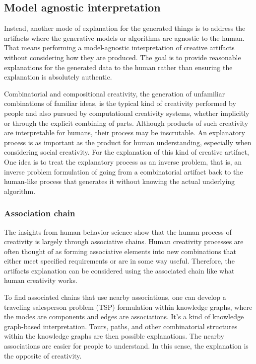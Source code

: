 \documentclass[]{article}
\begin{document}
\subsection{Model agnostic interpretation}
Instead, another mode of explanation for the generated things is to address the artifacts where the generative models or algorithms are agnostic to the human. 
That means performing a model-agnostic interpretation of creative artifacts without considering how they are produced. 
The goal is to provide reasonable explanations for the generated data to the human rather than ensuring the explanation is absolutely authentic. 

Combinatorial and compositional creativity, the generation of unfamiliar combinations of familiar ideas, is the typical kind of creativity performed by people and also pursued by computational creativity systems, whether implicitly or through the explicit combining of parts. 
Although products of such creativity are interpretable for humans, their process may be inscrutable. 
An explanatory process is as important as the product for human understanding, especially when considering social creativity. 
For the explanation of this kind of creative artifact, One idea is to treat the explanatory process as an inverse problem, that is, an inverse problem formulation of going from a combinatorial artifact back to the human-like process that generates it without knowing the actual underlying algorithm. 

\subsubsection{Association chain}
The insights from human behavior science show that the human process of creativity is largely through associative chains. 
Human creativity processes are often thought of as forming associative elements into new combinations that either meet specified requirements or are in some way useful. 
Therefore, the artifacts explanation can be considered using the associated chain like what human creativity works. 

To find associated chains that use nearby associations, one can develop a traveling salesperson problem (TSP) formulation within knowledge graphs, where the modes are components and edges are associations. 
It's a kind of knowledge graph-based interpretation.
Tours, paths, and other combinatorial structures within the knowledge graphs are then possible explanations. 
The nearby associations are easier for people to understand.
In this sense, the explanation is the opposite of creativity.
\end{document}
